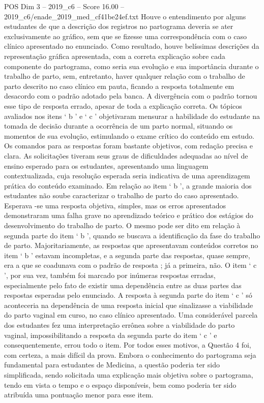 \begin{textsample}{POS Dim 3 – 2019\_c6 – Score 16.00 – 2019\_c6/enade\_2019\_med\_cf41be24ef.txt}
Houve o entendimento por alguns estudantes de que a descrição dos registros no partograma deveria se ater exclusivamente ao gráfico, sem que se fizesse uma correspondência com o caso clínico apresentado no enunciado.
Como resultado, houve belíssimas descrições da representação gráfica apresentada, com a correta explicação sobre cada componente do partograma, como seria sua evolução e sua importância durante o trabalho de parto, sem, entretanto, haver qualquer relação com o trabalho de parto descrito no caso clínico em pauta, ficando a resposta totalmente em desacordo com o padrão adotado pela banca.
A divergência com o padrão tornou esse tipo de resposta errado, apesar de toda a explicação correta.
Os tópicos avaliados nos itens ‘ b ’ e ‘ c ’ objetivaram mensurar a habilidade do estudante na tomada de decisão durante a ocorrência de um parto normal, situando os momentos de sua evolução, estimulando o exame crítico do conteúdo em estudo.
Os comandos para as respostas foram bastante objetivos, com redação precisa e clara.
As solicitações tiveram seus graus de dificuldades adequadas ao nível de ensino esperado para os estudantes, apresentando uma linguagem contextualizada, cuja resolução esperada seria indicativa de uma aprendizagem prática do conteúdo examinado.
Em relação ao item ‘ b ’, a grande maioria dos estudantes não soube caracterizar o trabalho de parto do caso apresentado.
Esperava -se uma resposta objetiva, simples, mas os erros apresentados demonstraram uma falha grave no aprendizado teórico e prático dos estágios do desenvolvimento do trabalho de parto.
O mesmo pode ser dito em relação à segunda parte do item ‘ b ’, quando se buscava a identificação da fase do trabalho de parto.
Majoritariamente, as respostas que apresentavam conteúdos corretos no item ‘ b ’ estavam incompletas, e a segunda parte das respostas, quase sempre, era a que se coadunava com o padrão de resposta ; já a primeira, não.
O item ‘ c ’, por sua vez, também foi marcado por inúmeras respostas erradas, especialmente pelo fato de existir uma dependência entre as duas partes das respostas esperadas pelo enunciado.
A resposta à segunda parte do item ‘ c ’ só aconteceria na dependência de uma resposta inicial que sinalizasse a viabilidade do parto vaginal em curso, no caso clínico apresentado.
Uma considerável parcela dos estudantes fez uma interpretação errônea sobre a viabilidade do parto vaginal, impossibilitando a resposta da segunda parte do item ‘ c ’ e consequentemente, errou todo o item.
Por todos esses motivos, a Questão 4 foi, com certeza, a mais difícil da prova.
Embora o conhecimento do partograma seja fundamental para estudantes de Medicina, a questão poderia ter sido simplificada, sendo solicitada uma explicação mais objetiva sobre o partograma, tendo em vista o tempo e o espaço disponíveis, bem como poderia ter sido atribuída uma pontuação menor para esse item.

\end{textsample}
